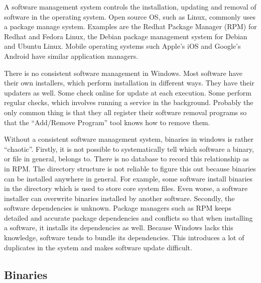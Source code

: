 A software management system controls the installation, updating and
removal of software in the operating system.
Open source OS, such as Linux, commonly uses a package manage system.
Examples are the Redhat Package Manager (RPM) for Redhat and Fedora Linux,
the Debian package management system for Debian and Ubuntu Linux.
Mobile operating systems such Apple's iOS and Google's Android have
similar application managers.

There is no consistent software management in Windows.
Most software have their own installers, which perform installation in
different ways.
They have their updaters as well.
Some check online for update at each execution.
Some perform regular checks, which involves running
a service in the background.
Probably the only common thing is that they all register their software
removal programs so that the ``Add/Remove Program'' tool knows
how to remove them.

Without a consistent software management system, binaries in windows
is rather ``chaotic''.
Firstly, it is not possible to systematically tell which software a binary,
or file in general, belongs to.
There is no database to record this relationship as in RPM.
The directory structure is not reliable to figure this out because
binaries can be installed anywhere in general.
For example, some software install binaries in the 
directory which is used to store core system files.
Even worse, a software installer can overwrite binaries installed by another
software.
Secondly, the software dependencies is unknown.
Package managers such as RPM keeps detailed and accurate
package dependencies and conflicts
so that when installing a software, it installs its dependencies as well.
Because Windows lacks this knowledge, software tends to bundle its dependencies.
This introduces a lot of duplicates in the system and makes software
update difficult.

\subsection{Binaries}
\label{sec:wi-binary}

